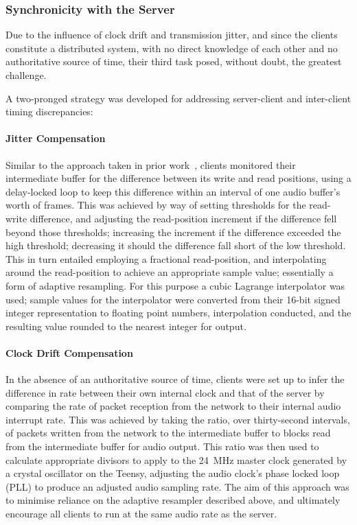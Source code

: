 \subsubsection{Synchronicity with the Server}\label{subsubsec:client-sync}

Due to the influence of clock drift and transmission jitter, and since the
clients constitute a distributed system, with no direct knowledge of each other
and no authoritative source of time, their third task posed, without doubt,
the greatest challenge.

A two-pronged strategy was developed for addressing server-client and
inter-client timing discrepancies:

\paragraph{Jitter Compensation}
Similar to the approach taken in prior
work~\citep{rushton_microcontroller-based_2023}, clients monitored their
intermediate buffer for the difference between its write and read positions,
using a delay-locked loop to keep this difference within an interval of
one audio buffer's worth of frames.
This was achieved by way of setting thresholds for the read-write difference,
and adjusting the read-position increment if the difference fell beyond those
thresholds;
increasing the increment if the difference exceeded the high threshold;
decreasing it should the difference fall short of the low threshold.
This in turn entailed employing a fractional read-position, and interpolating
around the read-position to achieve an appropriate sample value; essentially
a form of adaptive resampling.
For this purpose a cubic Lagrange interpolator was used; sample values for the
interpolator were converted from their 16-bit signed integer representation
to floating point numbers, interpolation conducted, and the resulting value
rounded to the nearest integer for output.

\paragraph{Clock Drift Compensation}
In the absence of an authoritative source of time, clients were set up to infer
the difference in rate between their own internal clock and that of the server
by comparing the rate of packet reception from the network to their internal
audio interrupt rate.
This was achieved by taking the ratio, over thirty-second intervals, of
packets written from the network to the intermediate buffer to blocks read
from the intermediate buffer for audio output.
This ratio was then used to calculate appropriate divisors to apply to the
\qty{24}{\MHz} master clock generated by a crystal oscillator on the Teensy,
adjusting the audio clock's phase locked loop (PLL) to produce an adjusted audio
sampling rate.
The aim of this approach was to minimise reliance on the adaptive resampler
described above, and ultimately encourage all clients to run at the same audio
rate as the server.

